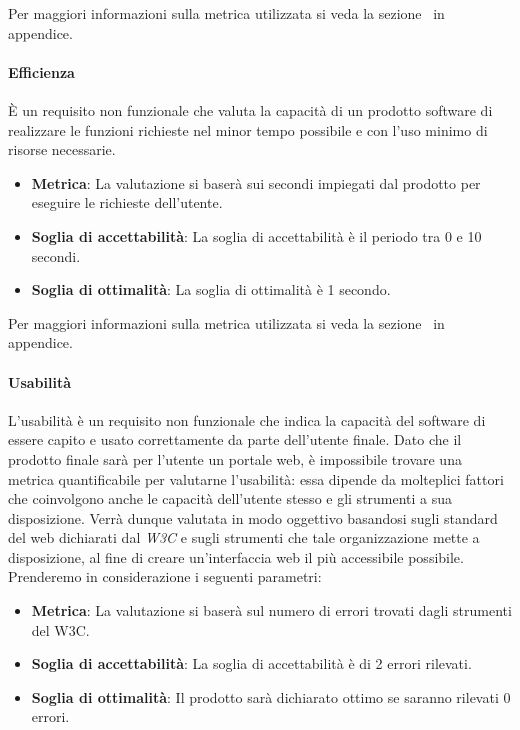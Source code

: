Per maggiori informazioni sulla metrica utilizzata si veda la sezione~ in appendice.

\paragraph{Efficienza}
È un requisito non funzionale che valuta la capacità di un prodotto software di realizzare le funzioni richieste nel minor tempo possibile e con l’uso minimo di risorse necessarie.
\begin{itemize}
	\item \textbf{Metrica}: La valutazione si baserà sui secondi impiegati dal prodotto per eseguire le richieste dell'utente.
	\item \textbf{Soglia di accettabilità}: La soglia di accettabilità è il periodo tra 0 e 10 secondi.
	\item \textbf{Soglia di ottimalità}: La soglia di ottimalità è 1 secondo.
\end{itemize}

Per maggiori informazioni sulla metrica utilizzata si veda la sezione~ in appendice.

\paragraph{Usabilità}
L'usabilità è un requisito non funzionale che indica la capacità del software di essere capito e usato correttamente da parte dell'utente finale. Dato che il prodotto finale sarà per l'utente un portale web, è impossibile trovare una metrica quantificabile per valutarne l'usabilità: essa dipende da molteplici fattori che coinvolgono anche le capacità dell'utente stesso e gli strumenti a sua disposizione. Verrà dunque valutata in modo oggettivo basandosi sugli standard del web dichiarati dal \emph{W3C} e sugli strumenti che tale organizzazione mette a disposizione, al fine di creare un'interfaccia web il più accessibile possibile.
Prenderemo in considerazione i seguenti parametri:
\begin{itemize}
	\item \textbf{Metrica}: La valutazione si baserà sul numero di errori trovati dagli strumenti del W3C.
	\item \textbf{Soglia di accettabilità}: La soglia di accettabilità è di 2 errori rilevati.
	\item \textbf{Soglia di ottimalità}: Il prodotto sarà dichiarato ottimo se saranno rilevati 0 errori.
\end{itemize}

